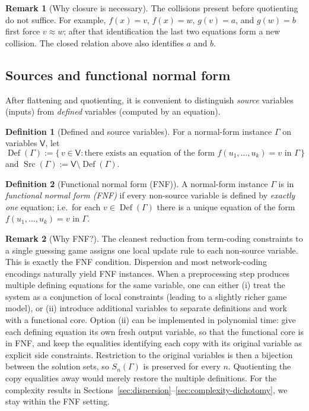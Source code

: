 \documentclass[11pt]{article}
\theoremstyle{definition}
\newtheorem{definition}{Definition}[section]
\newtheorem{remark}{Remark}[section]
\theoremstyle{plain}
\newcommand{\Vars}{\mathsf{V}}
\DeclareMathOperator{\Def}{Def}
\DeclareMathOperator{\Src}{Src}
\begin{document}
\begin{remark}[Why closure is necessary]
The collisions present before quotienting do not suffice.  For example,
$f(x)=v$, $f(x)=w$, $g(v)=a$, and $g(w)=b$ first force $v\approx w$; after that identification the last two
equations form a new collision.  The closed relation above also identifies $a$ and $b$.
\end{remark}

\subsection{Sources and functional normal form}
After flattening and quotienting, it is convenient to distinguish \emph{source} variables (inputs) from
\emph{defined} variables (computed by an equation).

\begin{definition}[Defined and source variables]
For a normal-form instance $\Gamma$ on variables $\Vars$, let
\[
\Def(\Gamma):=\{\,v\in\Vars : \text{there exists an equation of the form $f(u_1,\dots,u_k)=v$ in $\Gamma$}\,\}
\]
and $\Src(\Gamma):=\Vars\setminus \Def(\Gamma)$.
\end{definition}

\begin{definition}[Functional normal form (FNF)]
\label{def:fnf}
A normal-form instance $\Gamma$ is in \emph{functional normal form (FNF)} if every non-source variable is
defined by \emph{exactly one} equation; i.e.\ for each $v\in\Def(\Gamma)$ there is a unique equation of the
form $f(u_1,\dots,u_k)=v$ in $\Gamma$.
\end{definition}

\begin{remark}[Why FNF?]
The cleanest reduction from term-coding constraints to a single guessing game assigns one local update rule
to each non-source variable.  This is exactly the FNF condition.
Dispersion and most network-coding encodings naturally yield FNF instances.
When a preprocessing step produces multiple defining equations for the same variable, one can either
(i) treat the system as a conjunction of local constraints (leading to a slightly richer game model), or
(ii) introduce additional variables to separate definitions and work with a functional core.
Option (ii) can be implemented in polynomial time: give each defining equation its own fresh output variable,
so that the functional core is in FNF, and keep the equalities identifying each copy with its original variable
as explicit side constraints.  Restriction to the original variables is then a bijection between the solution
sets, so $S_n(\Gamma)$ is preserved for every $n$.  Quotienting the copy equalities away would merely restore
the multiple definitions.
For the complexity results in Sections~\ref{sec:dispersion}--\ref{sec:complexity-dichotomy}, we stay within the FNF
setting.
\end{remark}
\end{document}

